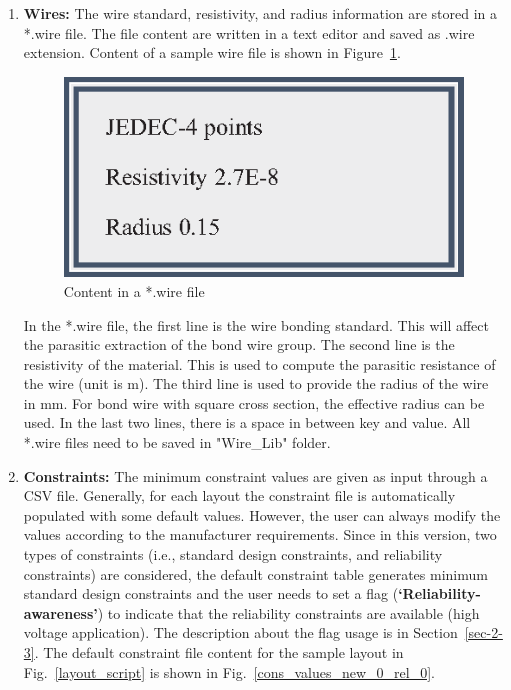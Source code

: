 \documentclass[11pt]{article}
\begin{document}
\begin{enumerate}
\item \textbf{Wires:}  The wire standard, resistivity, and radius information are stored in a *.wire file. The file content are written in a text editor and saved as .wire extension. Content of a sample wire file is shown in Figure~\ref{wire_def}.
    \begin{figure}[H]
    \centering
    \includegraphics[width=2 in, height=1 in]{figs/v_1.9_figs/bw_info.eps}
    \caption{Content in a *.wire file}
    \label{wire_def}
    \end{figure}
    
In the *.wire file, the first line is the wire bonding standard. This will affect the parasitic extraction of the bond wire group. The second line is the resistivity of the material. This is used to compute the parasitic resistance of the wire (unit is \textohm m). The third line is used to provide the radius of the wire in mm. For bond wire with square cross section, the effective radius can be used. In the last two lines, there is a space in between key and value. All *.wire files need to be saved in "Wire\_Lib" folder. \\

\item \textbf{Constraints:}
The minimum constraint values are given as input through a CSV file. Generally, for each layout the constraint file is automatically populated with some default values. However, the user can always modify the values according to the manufacturer requirements. Since in this version, two types of constraints (i.e., standard design constraints, and reliability constraints) are considered, the default constraint table generates minimum standard design constraints and the user needs to set a flag (\textbf{`Reliability-awareness'}) to indicate that the reliability constraints are available (high voltage application). The description about the flag usage is in Section~\ref{sec-2-3}. The default constraint file content for the sample layout in Fig.~\ref{layout_script} is shown in Fig.~\ref{cons_values_new_0_rel_0}.


\end{enumerate}
\end{document}
